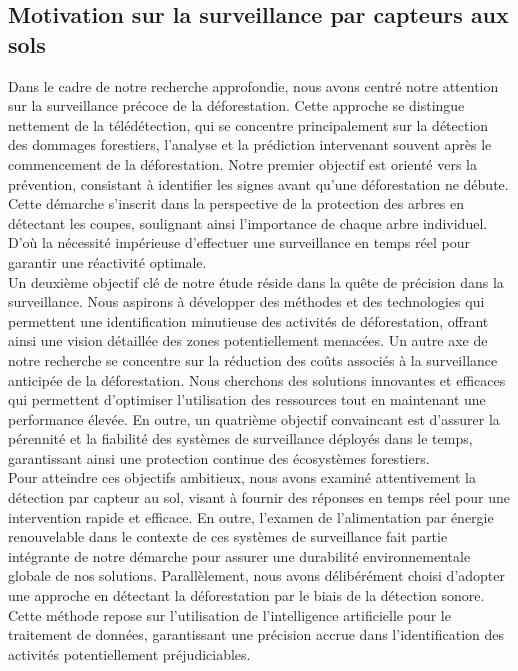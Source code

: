 \subsection{Motivation sur la surveillance par capteurs aux sols}
Dans le cadre de notre recherche approfondie, nous avons centré notre attention sur la surveillance précoce de la déforestation. Cette approche se distingue nettement de la télédétection, qui se concentre principalement sur la détection des dommages forestiers, l'analyse et la prédiction intervenant souvent après le commencement de la déforestation. Notre premier objectif est orienté vers la prévention, consistant à identifier les signes avant qu'une déforestation ne débute. Cette démarche s'inscrit dans la perspective de la protection des arbres en détectant les coupes, soulignant ainsi l'importance de chaque arbre individuel. D'où la nécessité impérieuse d'effectuer une surveillance en temps réel pour garantir une réactivité optimale.
\\

Un deuxième objectif clé de notre étude réside dans la quête de précision dans la surveillance. Nous aspirons à développer des méthodes et des technologies qui permettent une identification minutieuse des activités de déforestation, offrant ainsi une vision détaillée des zones potentiellement menacées. Un autre axe de notre recherche se concentre sur la réduction des coûts associés à la surveillance anticipée de la déforestation. Nous cherchons des solutions innovantes et efficaces qui permettent d'optimiser l'utilisation des ressources tout en maintenant une performance élevée. En outre, un quatrième objectif convaincant est d'assurer la pérennité et la fiabilité des systèmes de surveillance déployés dans le temps, garantissant ainsi une protection continue des écosystèmes forestiers.
\\

Pour atteindre ces objectifs ambitieux, nous avons examiné attentivement la détection par capteur au sol, visant à fournir des réponses en temps réel pour une intervention rapide et efficace. En outre, l'examen de l'alimentation par énergie renouvelable dans le contexte de ces systèmes de surveillance fait partie intégrante de notre démarche pour assurer une durabilité environnementale globale de nos solutions. Parallèlement, nous avons délibérément choisi d'adopter une approche en détectant la déforestation par le biais de la détection sonore. Cette méthode repose sur l'utilisation de l'intelligence artificielle pour le traitement de données, garantissant une précision accrue dans l'identification des activités potentiellement préjudiciables.